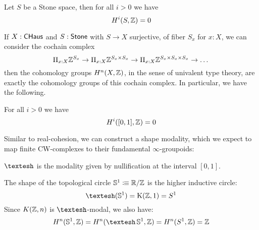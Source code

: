 \begin{theorem}
Let $S$ be a Stone space, then for all $i>0$ we have \[H^i(S,\mathbb{Z}) = 0\]
\end{theorem}

If $X:\mathsf{CHaus}$ and $S:\mathsf{Stone}$ with $S\rightarrow X$ surjective, of fiber $S_x$ for $x:X$,  we can consider the cochain complex
\[\Pi_{x:X}\mathbb{Z}^{S_x}\rightarrow \Pi_{x:X}\mathbb{Z}^{S_x\times S_x}\rightarrow \Pi_{x:X}\mathbb{Z}^{S_x\times S_x\times S_x}\rightarrow\dots\]
then the cohomology groups $H^n(X,\mathbb{Z})$, in the sense of univalent type theory, are exactly the cohomology groups of this
cochain complex. In particular, we have the following.

\begin{proposition}
For all $i>0$ we have \[H^i([0,1],\mathbb{Z}) = 0\]
\end{proposition}

Similar to real-cohesion, we can construct a shape modality, which we expect to map finite CW-complexes to their fundamental $\infty$-groupoids:

\begin{definition}
  $\shape$ is the modality given by nullification at the interval $[0,1]$.
\end{definition}

\begin{proposition}
  The shape of the topological circle $\mathbb{S}^1\vcentcolon\mspace{-1.2mu}\equiv \mathbb{R}/\mathbb{Z}$ is the higher inductive circle: 
  \[
  \shape(\bS^1)=\mathrm{K}(\Z,1)=S^1
  \]
  Since $K(\mathbb{Z},n)$ is $\shape$-modal, we also have:
  \[
  H^n(\bS^1,\Z) = H^n(\shape \bS^1,\Z) = H^n(S^1,\Z) = \Z
  \]
\end{proposition}

